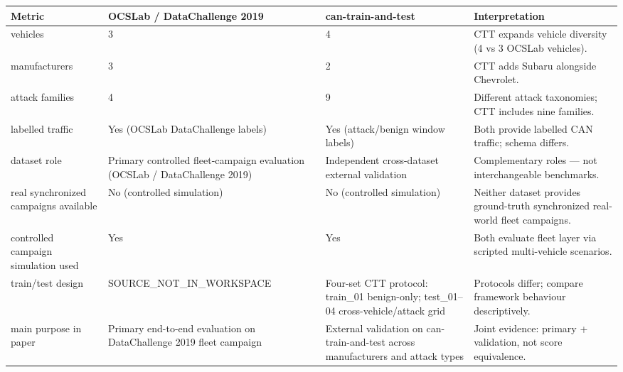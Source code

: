 \begin{tabular}{llll}
\toprule
Metric & OCSLab / DataChallenge 2019 & can-train-and-test & Interpretation \\
\midrule
vehicles & 3 & 4 & CTT expands vehicle diversity (4 vs 3 OCSLab vehicles). \\
manufacturers & 3 & 2 & CTT adds Subaru alongside Chevrolet. \\
attack families & 4 & 9 & Different attack taxonomies; CTT includes nine families. \\
labelled traffic & Yes (OCSLab DataChallenge labels) & Yes (attack/benign window labels) & Both provide labelled CAN traffic; schema differs. \\
dataset role & Primary controlled fleet-campaign evaluation (OCSLab / DataChallenge 2019) & Independent cross-dataset external validation & Complementary roles — not interchangeable benchmarks. \\
real synchronized campaigns available & No (controlled simulation) & No (controlled simulation) & Neither dataset provides ground-truth synchronized real-world fleet campaigns. \\
controlled campaign simulation used & Yes & Yes & Both evaluate fleet layer via scripted multi-vehicle scenarios. \\
train/test design & SOURCE_NOT_IN_WORKSPACE & Four-set CTT protocol: train_01 benign-only; test_01–04 cross-vehicle/attack grid & Protocols differ; compare framework behaviour descriptively. \\
main purpose in paper & Primary end-to-end evaluation on DataChallenge 2019 fleet campaign & External validation on can-train-and-test across manufacturers and attack types & Joint evidence: primary + validation, not score equivalence. \\
\bottomrule
\end{tabular}
